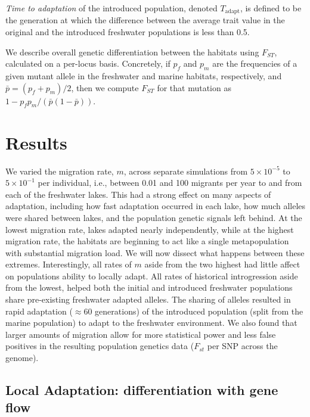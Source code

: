 \documentclass{article}
\begin{document}
\emph{Time to adaptation} of the introduced population, denoted $T_\text{adapt}$, 
is defined to be the generation at which 
the difference between the average trait value in the original and the introduced freshwater populations 
is less than 0.5. 

We describe overall genetic differentiation between the habitats using $F_{ST}$,
calculated on a per-locus basis.
Concretely, if $p_f$ and $p_m$ are the frequencies of a given mutant allele
in the freshwater and marine habitats, respectively,
and $\bar p = (p_f + p_m)/2$,
then we compute $F_{ST}$ for that mutation as $1 - p_f p_m / (\bar p (1-\bar p))$.

\section{Results}

We varied the migration rate, $m$, across separate simulations
from $5 \times 10^{-5}$ to $5 \times 10^{-1}$ per individual,
i.e., between 0.01 and 100 migrants per year to and from each of the freshwater lakes.
This had a strong effect on many aspects of adaptation,
including how fast adaptation occurred in each lake,
how much alleles were shared between lakes,
and the population genetic signals left behind.
At the lowest migration rate, lakes adapted nearly independently,
while at the highest migration rate, the habitats are beginning to act like a single metapopulation
with substantial migration load.
We will now dissect what happens between these extremes.
Interestingly, all rates of $m$ aside from the two highest had little affect on populations ability to locally adapt.
All rates of historical introgression aside from the lowest, helped both the initial and introduced freshwater populations 
share pre-existing freshwater adapted alleles.
The sharing of alleles resulted in rapid adaptation ($\approx 60$ generations) of the introduced population (split from the marine population) to adapt to the freshwater environment.
We also found that larger amounts of migration allow for more statistical power and less false positives in the resulting population genetics data ($F_{st}$ per SNP across the genome).

\subsection*{Local Adaptation: differentiation with gene flow}
\end{document}
